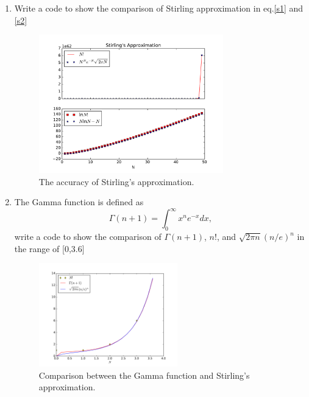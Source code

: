 \begin{enumerate}
\item Write a code to show the comparison of Stirling approximation in eq.\ref{s1} and \ref{s2}
\begin{figure}[h]
\centering
\includegraphics[width=8cm]{imgs/Stirling.pdf}
\caption{The accuracy of Stirling's approximation. }
\end{figure}

\item The Gamma function is defined as 
\begin{equation} \Gamma(n+1) = \int ^\infty _0 x^n e^{-x} dx, \end{equation}
write a code to show the comparison of $\Gamma(n+1)$, $n$!, and $\sqrt{2\pi n}(n/e)^n$ in the range of [0,3.6]
\begin{figure}[h]
\centering
\includegraphics[width=6cm]{imgs/Stirling2.pdf}
\caption{Comparison between the Gamma function and Stirling's approximation. }
\end{figure}


\end{enumerate}
